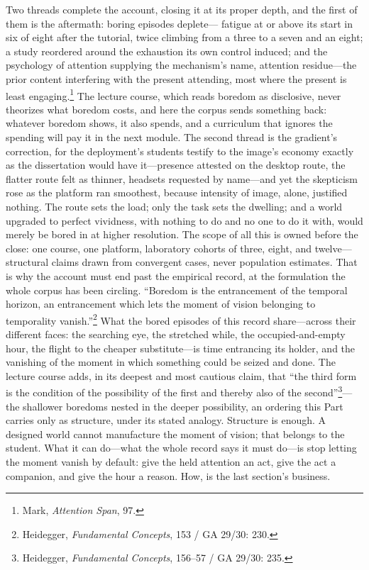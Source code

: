 \documentclass{article}
\begin{document}
Two threads complete the account, closing it at its proper depth, and the first of them is the aftermath: boring episodes deplete--- fatigue at or above its start in six of eight after the tutorial, twice climbing from a three to a seven and an eight; a study reordered around the exhaustion its own control induced; and the psychology of attention supplying the mechanism's name, attention residue---the prior content interfering with the present attending, most where the present is least engaging.\footnote{Mark, \textit{Attention Span}, 97.} The lecture course, which reads boredom as disclosive, never theorizes what boredom costs, and here the corpus sends something back: whatever boredom shows, it also spends, and a curriculum that ignores the spending will pay it in the next module. The second thread is the gradient's correction, for the deployment's students testify to the image's economy exactly as the dissertation would have it---presence attested on the desktop route, the flatter route felt as thinner, headsets requested by name---and yet the skepticism rose as the platform ran smoothest, because intensity of image, alone, justified nothing. The route sets the load; only the task sets the dwelling; and a world upgraded to perfect vividness, with nothing to do and no one to do it with, would merely be bored in at higher resolution. The scope of all this is owned before the close: one course, one platform, laboratory cohorts of three, eight, and twelve---structural claims drawn from convergent cases, never population estimates. That is why the account must end past the empirical record, at the formulation the whole corpus has been circling. ``Boredom is the entrancement of the temporal horizon, an entrancement which lets the moment of vision belonging to temporality vanish.''\footnote{Heidegger, \textit{Fundamental Concepts}, 153 / GA 29/30: 230.} What the bored episodes of this record share---across their different faces: the searching eye, the stretched while, the occupied-and-empty hour, the flight to the cheaper substitute---is time entrancing its holder, and the vanishing of the moment in which something could be seized and done. The lecture course adds, in its deepest and most cautious claim, that ``the third form is the condition of the possibility of the first and thereby also of the second''\footnote{Heidegger, \textit{Fundamental Concepts}, 156--57 / GA 29/30: 235.}---the shallower boredoms nested in the deeper possibility, an ordering this Part carries only as structure, under its stated analogy. Structure is enough. A designed world cannot manufacture the moment of vision; that belongs to the student. What it can do---what the whole record says it must do---is stop letting the moment vanish by default: give the held attention an act, give the act a companion, and give the hour a reason. How, is the last section's business.
\end{document}
